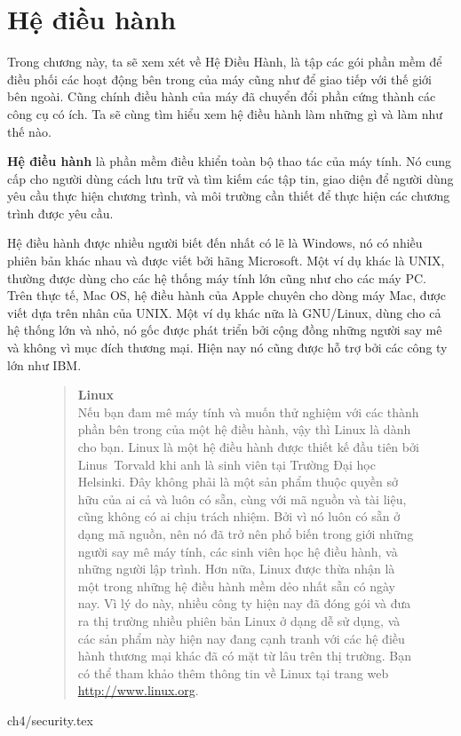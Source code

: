 
\chapter{Hệ điều hành}
\label{chap:4}

\minitoc
\vspace{0.5cm}
\noindent
Trong chương này, ta sẽ xem xét về Hệ Điều Hành, là tập các gói phần mềm để điều phối các
 hoạt động bên trong của máy cũng như để giao tiếp với thế giới bên ngoài. Cũng chính điều
hành của máy đã chuyển đổi phần cứng thành các công cụ có ích. Ta sẽ cùng tìm hiểu xem hệ
điều hành làm những gì và làm như thế nào.

\textbf{Hệ điều hành} là phần mềm điều khiển toàn bộ thao tác của máy tính. Nó cung cấp
cho người dùng cách lưu trữ và tìm kiếm các tập tin, giao diện để người dùng yêu cầu thực
hiện chương trình, và môi trường cần thiết để thực hiện các chương trình được yêu cầu.


Hệ điều hành được nhiều người biết đến nhất có lẽ là Windows, nó có nhiều phiên bản khác
nhau và được viết bởi hãng Microsoft. Một ví dụ khác là UNIX, thường được dùng cho các hệ
thống máy tính lớn cũng như cho các máy PC. Trên thực tế, Mac OS, hệ điều hành của Apple
chuyên cho dòng máy Mac, được viết dựa trên nhân của UNIX. Một ví dụ khác nữa là
GNU/Linux, dùng cho cả hệ thống lớn và nhỏ, nó gốc được phát triển bởi cộng đồng những
người say mê và không vì mục đích thương mại.  Hiện nay nó cũng được hỗ trợ bởi các công
ty lớn như IBM.

\begin{figure}
\begin{quotation}
\noindent
\textbf{Linux} \vspace{0.3cm}
\\
Nếu bạn đam mê máy tính và muốn thử nghiệm với các thành phần bên trong của một hệ điều
hành, vậy thì Linux là dành cho bạn. Linux là một hệ điều hành được thiết kế đầu tiên bởi
Linus~Torvald khi anh là sinh viên tại Trường Đại học Helsinki. Đây không phải là một sản
phẩm thuộc quyền sở hữu của ai cả và luôn có sẵn, cùng với mã nguồn và tài liệu, cũng
không có ai chịu trách nhiệm. Bởi vì nó luôn có sẵn ở dạng mã nguồn, nên nó đã trở nên phổ
biến trong giới những người say mê máy tính, các sinh viên học hệ điều hành, và những
người lập trình. Hơn nữa, Linux được thừa nhận là một trong những hệ điều hành mềm dẻo
nhất sẵn có ngày nay. Vì lý do này, nhiều công ty hiện nay đã đóng gói và đưa ra thị
trường nhiều phiên bản Linux ở dạng dễ sử dụng, và các sản phẩm này hiện nay đang cạnh
tranh với các hệ điều hành thương mại khác đã có mặt từ lâu trên thị trường. Bạn có thể
tham khảo thêm thông tin về Linux tại trang web \url{http://www.linux.org}.
\end{quotation}
\end{figure}
 


 {ch4/security.tex}
   
